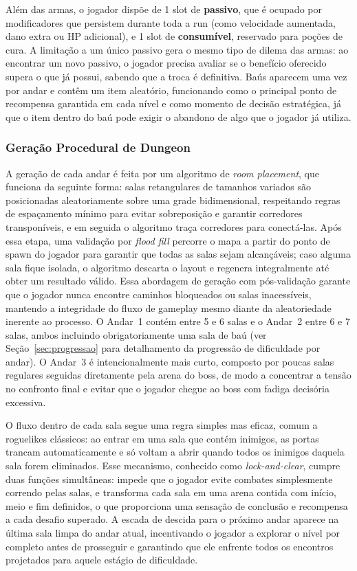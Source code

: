\documentclass[12pt, a4paper]{article}
\begin{document}
Al\'em das armas, o jogador disp\~oe de 1 slot de \textbf{passivo}, que \'e ocupado por modificadores que persistem durante toda a run (como velocidade aumentada, dano extra ou HP adicional), e 1 slot de \textbf{consum\'ivel}, reservado para po\c{c}\~oes de cura. A limita\c{c}\~ao a um \'unico passivo gera o mesmo tipo de dilema das armas: ao encontrar um novo passivo, o jogador precisa avaliar se o benef\'icio oferecido supera o que j\'a possui, sabendo que a troca \'e definitiva. Ba\'us aparecem uma vez por andar e cont\^em um item aleat\'orio, funcionando como o principal ponto de recompensa garantida em cada n\'ivel e como momento de decis\~ao estrat\'egica, j\'a que o item dentro do ba\'u pode exigir o abandono de algo que o jogador j\'a utiliza.

\subsubsection{Gera\c{c}\~ao Procedural de Dungeon}

A gera\c{c}\~ao de cada andar \'e feita por um algoritmo de \textit{room placement}, que funciona da seguinte forma: salas retangulares de tamanhos variados s\~ao posicionadas aleatoriamente sobre uma grade bidimensional, respeitando regras de espa\c{c}amento m\'inimo para evitar sobreposi\c{c}\~ao e garantir corredores transpon\'iveis, e em seguida o algoritmo tra\c{c}a corredores para conect\'a-las. Ap\'os essa etapa, uma valida\c{c}\~ao por \textit{flood fill} percorre o mapa a partir do ponto de spawn do jogador para garantir que todas as salas sejam alcan\c{c}\'aveis; caso alguma sala fique isolada, o algoritmo descarta o layout e regenera integralmente at\'e obter um resultado v\'alido. Essa abordagem de gera\c{c}\~ao com p\'os-valida\c{c}\~ao garante que o jogador nunca encontre caminhos bloqueados ou salas inacess\'iveis, mantendo a integridade do fluxo de gameplay mesmo diante da aleatoriedade inerente ao processo. O Andar~1 cont\'em entre 5 e 6 salas e o Andar~2 entre 6 e 7 salas, ambos incluindo obrigatoriamente uma sala de ba\'u (ver Se\c{c}\~ao~\ref{sec:progressao} para detalhamento da progress\~ao de dificuldade por andar). O Andar~3 \'e intencionalmente mais curto, composto por poucas salas regulares seguidas diretamente pela arena do boss, de modo a concentrar a tens\~ao no confronto final e evitar que o jogador chegue ao boss com fadiga decis\'oria excessiva.

O fluxo dentro de cada sala segue uma regra simples mas eficaz, comum a roguelikes cl\'assicos: ao entrar em uma sala que cont\'em inimigos, as portas trancam automaticamente e s\'o voltam a abrir quando todos os inimigos daquela sala forem eliminados. Esse mecanismo, conhecido como \textit{lock-and-clear}, cumpre duas fun\c{c}\~oes simult\^aneas: impede que o jogador evite combates simplesmente correndo pelas salas, e transforma cada sala em uma arena contida com in\'icio, meio e fim definidos, o que proporciona uma sensa\c{c}\~ao de conclus\~ao e recompensa a cada desafio superado. A escada de descida para o pr\'oximo andar aparece na \'ultima sala limpa do andar atual, incentivando o jogador a explorar o n\'ivel por completo antes de prosseguir e garantindo que ele enfrente todos os encontros projetados para aquele est\'agio de dificuldade.
\end{document}
